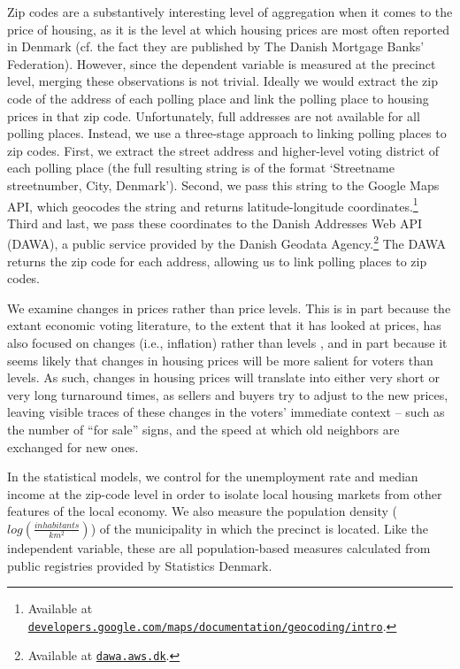 \documentclass[12pt,a4paper]{article}
\begin{document}
	Zip codes are a substantively interesting level of aggregation when it comes to the price of housing, as it is the level at which housing prices are most often reported in Denmark (cf. the fact they are published by The Danish Mortgage Banks' Federation). However, since the dependent variable is measured at the precinct level, merging these observations is not trivial. Ideally we would extract the zip code of the address of each polling place and link the polling place to housing prices in that zip code. Unfortunately, full addresses are not available for all polling places. Instead, we use a three-stage approach to linking polling places to zip codes. First, we extract the street address and higher-level voting district of each polling place (the full resulting string is of the format `Streetname streetnumber, City, Denmark'). Second, we pass this string to the Google Maps API, which geocodes the string and returns latitude-longitude coordinates.\footnote{Available at \texttt{\href{https://developers.google.com/maps/documentation/geocoding/intro}{developers.google.com/maps/documentation/geocoding/intro}}.} Third and last, we pass these coordinates to the Danish Addresses Web API (DAWA), a public service provided by the Danish Geodata Agency.\footnote{Available at \texttt{\href{http://dawa.aws.dk/}{dawa.aws.dk}}.} The DAWA returns the zip code for each address, allowing us to link polling places to zip codes. %
	
	We examine changes in prices rather than price levels. This is in part because the extant economic voting literature, to the extent that it has looked at prices, has also focused on changes (i.e., inflation) rather than levels \citep[cf.][]{kramer1971short}, and in part because it seems likely that changes in housing prices will be more salient for voters than levels. As such, changes in housing prices will translate into either very short or very long turnaround times, as sellers and buyers try to adjust to the new prices, leaving visible traces of these changes in the voters' immediate context -- such as the number of ``for sale'' signs, and the speed at which old neighbors are exchanged for new ones.
	
	In the statistical models, we control for the unemployment rate and median income at the zip-code level in order to isolate local housing markets from other features of the local economy. We also measure the population density ($log(\frac{inhabitants}{km^2})$) of the municipality in which the precinct is located. Like the independent variable, these are all population-based measures calculated from public registries provided by Statistics Denmark.
	
\end{document}
